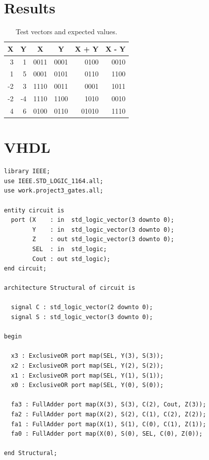 \documentclass{article}
\begin{document}
\section{Results}
\label{sec:results}

\begin{table}[hbtp]
  \centering
  \begin{tabular}{r|r|c|c|r|r}
    X  & Y  & X    & Y    & X + Y & X - Y \\
    \hline
    3  & 1  & 0011 & 0001 & 0100  & 0010  \\
    1  & 5  & 0001 & 0101 & 0110  & 1100  \\
    -2 & 3  & 1110 & 0011 & 0001  & 1011  \\
    -2 & -4 & 1110 & 1100 & 1010  & 0010  \\
    4  & 6  & 0100 & 0110 & 01010 & 1110  \\
\end{tabular}
  \caption{\label{tab:values}Test vectors and expected values.}
\end{table}

\section{VHDL}
\label{sec:vhdl}

\begin{verbatim}
library IEEE;
use IEEE.STD_LOGIC_1164.all;
use work.project3_gates.all;

entity circuit is
  port (X    : in  std_logic_vector(3 downto 0);
        Y    : in  std_logic_vector(3 downto 0);
        Z    : out std_logic_vector(3 downto 0);
        SEL  : in  std_logic;
        Cout : out std_logic);
end circuit;

architecture Structural of circuit is

  signal C : std_logic_vector(2 downto 0);
  signal S : std_logic_vector(3 downto 0);

begin

  x3 : ExclusiveOR port map(SEL, Y(3), S(3));
  x2 : ExclusiveOR port map(SEL, Y(2), S(2));
  x1 : ExclusiveOR port map(SEL, Y(1), S(1));
  x0 : ExclusiveOR port map(SEL, Y(0), S(0));

  fa3 : FullAdder port map(X(3), S(3), C(2), Cout, Z(3));
  fa2 : FullAdder port map(X(2), S(2), C(1), C(2), Z(2));
  fa1 : FullAdder port map(X(1), S(1), C(0), C(1), Z(1));
  fa0 : FullAdder port map(X(0), S(0), SEL, C(0), Z(0));

end Structural;
\end{verbatim}
\end{document}
